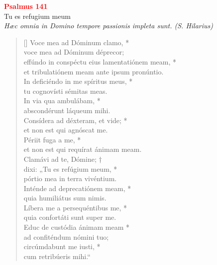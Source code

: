


\def\greinitialformat#1{%
{\fontsize{39}{39}\selectfont #1}%
}




\vspace{0.3cm}
\begin{center}
 \textcolor{red}{\large \bf Psalmus 141}\\
Tu es refugium meum\\
\textit{\small Hæc omnia in Domino tempore passionis impleta sunt. (S. Hilarius)}
\end{center}
\begin{verse}[\versewidth]
Voce mea ad Dóminum clamo, *\\
voce mea ad Dóminum déprecor;\\
\vin effúndo in conspéctu eius lamentatiónem meam, *\\
\vin et tribulatiónem meam ante ipsum pronúntio.\\
In deficiéndo in me spíritus meus, *\\
tu cognovísti sémitas meas.\\
\vin In via qua ambulábam, *\\
\vin abscondérunt láqueum mihi.\\
Consídera ad déxteram, et vide; *\\
et non est qui agnóscat me.\\
\vin Périit fuga a me, *\\
\vin et non est qui requírat ánimam meam.\\
Clamávi ad te, Dómine; †\\
dixi: „Tu es refúgium meum, *\\
pórtio mea in terra vivéntium.\\
\vin Inténde ad deprecatiónem meam, *\\
\vin quia humiliátus sum nimis.\\
Líbera me a persequéntibus me, *\\
quia confortáti sunt super me.\\
\vin Educ de custódia ánimam meam *\\
\vin ad confiténdum nómini tuo;\\
circúmdabunt me iusti, *\\
cum retribúeris mihi.“\\
\end{verse}
\vspace{1cm}


